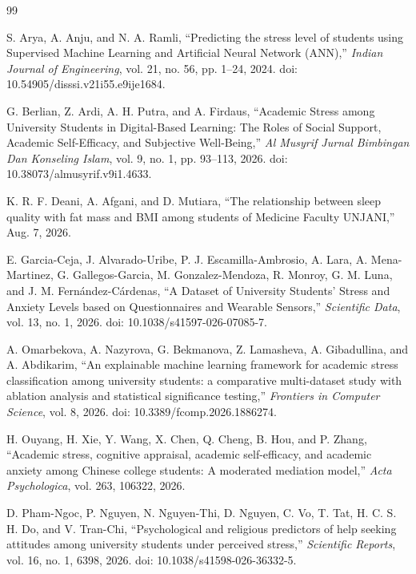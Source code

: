 \documentclass[conference]{IEEEtran}
\begin{document}

\begin{thebibliography}{99}

S. Arya, A. Anju, and N. A. Ramli,
``Predicting the stress level of students using Supervised Machine Learning and Artificial Neural Network (ANN),''
\textit{Indian Journal of Engineering},
vol. 21, no. 56, pp. 1--24, 2024.
doi: 10.54905/disssi.v21i55.e9ije1684.

G. Berlian, Z. Ardi, A. H. Putra, and A. Firdaus,
``Academic Stress among University Students in Digital-Based Learning: The Roles of Social Support, Academic Self-Efficacy, and Subjective Well-Being,''
\textit{Al Musyrif Jurnal Bimbingan Dan Konseling Islam},
vol. 9, no. 1, pp. 93--113, 2026.
doi: 10.38073/almusyrif.v9i1.4633.

K. R. F. Deani, A. Afgani, and D. Mutiara,
``The relationship between sleep quality with fat mass and BMI among students of Medicine Faculty UNJANI,''
Aug. 7, 2026.

E. Garcia-Ceja, J. Alvarado-Uribe, P. J. Escamilla-Ambrosio,
A. Lara, A. Mena-Martinez, G. Gallegos-Garcia,
M. Gonzalez-Mendoza, R. Monroy, G. M. Luna, and
J. M. Fernández-Cárdenas,
``A Dataset of University Students' Stress and Anxiety Levels based on Questionnaires and Wearable Sensors,''
\textit{Scientific Data},
vol. 13, no. 1, 2026.
doi: 10.1038/s41597-026-07085-7.

A. Omarbekova, A. Nazyrova, G. Bekmanova, Z. Lamasheva,
A. Gibadullina, and A. Abdikarim,
``An explainable machine learning framework for academic stress classification among university students: a comparative multi-dataset study with ablation analysis and statistical significance testing,''
\textit{Frontiers in Computer Science},
vol. 8, 2026.
doi: 10.3389/fcomp.2026.1886274.

H. Ouyang, H. Xie, Y. Wang, X. Chen, Q. Cheng, B. Hou,
and P. Zhang,
``Academic stress, cognitive appraisal, academic self-efficacy, and academic anxiety among Chinese college students: A moderated mediation model,''
\textit{Acta Psychologica},
vol. 263, 106322, 2026.

D. Pham-Ngoc, P. Nguyen, N. Nguyen-Thi, D. Nguyen,
C. Vo, T. Tat, H. C. S. H. Do, and V. Tran-Chi,
``Psychological and religious predictors of help seeking attitudes among university students under perceived stress,''
\textit{Scientific Reports},
vol. 16, no. 1, 6398, 2026.
doi: 10.1038/s41598-026-36332-5.


\end{thebibliography}
\end{document}
